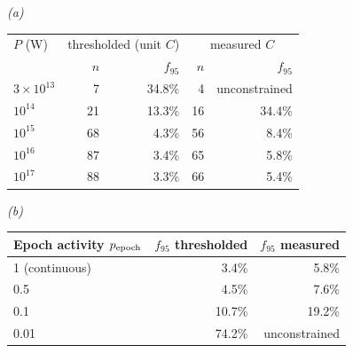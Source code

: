 \emph{(a)}\\[2pt]
\begin{tabular}{@{}lrrrr@{}}
\toprule
$P$ (W) & \multicolumn{2}{c}{thresholded (unit $C$)} &
\multicolumn{2}{c}{measured $C$} \\
 & $n$ & $f_{95}$ & $n$ & $f_{95}$ \\
\midrule
$3\times10^{13}$ & 7 & 34.8\% & 4 & unconstrained \\
$10^{14}$ & 21 & 13.3\% & 16 & 34.4\% \\
$10^{15}$ & 68 & 4.3\% & 56 & 8.4\% \\
$10^{16}$ & 87 & 3.4\% & 65 & 5.8\% \\
$10^{17}$ & 88 & 3.3\% & 66 & 5.4\% \\
\bottomrule
\end{tabular}

\smallskip
\emph{(b)}\\[2pt]
\begin{tabular}{@{}lrr@{}}
\toprule
Epoch activity $p_{\rm epoch}$ & $f_{95}$ thresholded & $f_{95}$ measured \\
\midrule
1 (continuous) & 3.4\% & 5.8\% \\
0.5 & 4.5\% & 7.6\% \\
0.1 & 10.7\% & 19.2\% \\
0.01 & 74.2\% & unconstrained \\
\bottomrule
\end{tabular}
